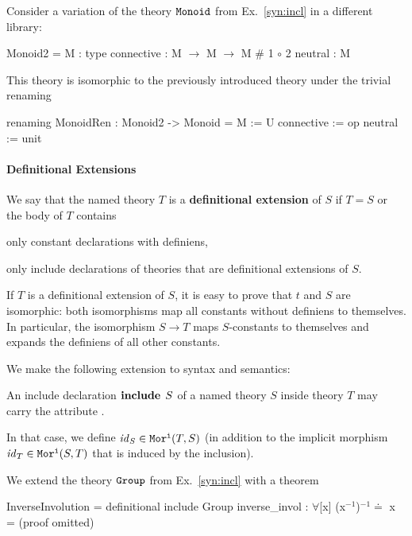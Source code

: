 \begin{example}[Renaming]
Consider a variation of the theory $\operatorname{\mathtt{Monoid}}$ from Ex.~\ref{syn:incl} in a different library:
\begin{mmtcode}
Monoid2 =
  M          : type
  connective : M $\to$ M $\to$ M	 # 1 $\circ$ 2 
  neutral    : M
\end{mmtcode}
This theory is isomorphic to the previously introduced theory  under the trivial renaming
	\begin{mmtcode}
renaming MonoidRen : Monoid2 -> Monoid =
  M          := U
  connective := op 
  neutral    := unit
\end{mmtcode}
\end{example}

\paragraph{Definitional Extensions}
We say that the named theory $T$ is a \textbf{definitional extension} of $S$ if $T=S$ or the body of $T$ contains
\begin{compactitem}
 \item only constant declarations with definiens,
 \item only include declarations of theories that are definitional extensions of $S$.
\end{compactitem}

If $T$ is a definitional extension of $S$, it is easy to prove that $t$ and $S$ are isomorphic: both isomorphisms map all constants without definiens to themselves. In particular, the isomorphism $S\to T$ maps $S$-constants to themselves and expands the definiens of all other constants.

We make the following extension to syntax and semantics:
\begin{compactitem}
  \item An include declaration $\operatorname{\mathbf{include}}{\;S}$ of a named theory $S$ inside theory $T$ may carry the attribute .
  \item In that case, we define $\mathit{id}_{S}\in\mathtt{Mor^i}(T,S)$ (in addition to the implicit morphism $\mathit{id}_{T}\in\mathtt{Mor^i}(S,T)$ that is induced by the inclusion).
\end{compactitem}

\begin{example}
We extend the theory $\operatorname{\mathtt{Group}}$ from Ex.~\ref{syn:incl} with a theorem
\begin{mmtcode}
InverseInvolution =
  definitional include Group
  inverse_invol : $\forall$[x] (x$^{-1}$)$^{-1}$$\doteq$ x  =  (proof omitted)
\end{mmtcode}
\end{example}

